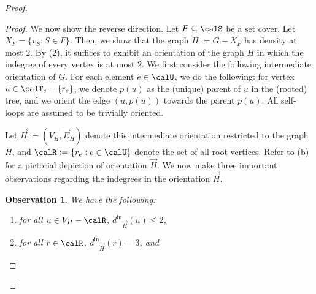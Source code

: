 \documentclass{article}
\newtheorem{observation}{Observation}[section]
\newcommand{\indegree}{\ensuremath{d^{\text{in}}}\xspace}
\begin{document}
\begin{proof}
\begin{proof}
        We now show the reverse direction. Let $F \subseteq \calS$ be a set cover. Let $X_F = \{v_S : S \in F\}$. Then, we show that the graph $H := G - X_F$ has density at most $2$. By (2), it suffices to exhibit an orientation of the graph $H$ in which the indegree of every vertex is at most $2$. We first consider the following intermediate orientation of $G$. For each element $e\in \calU$, we do the following: for vertex $u \in \calT_e - \{r_e\}$, we denote $p(u)$ as the (unique) parent of $u$ in the (rooted) tree, and we orient the edge $(u, p(u))$ towards the parent $p(u)$. All self-loops are assumed to be trivially oriented.
\iffalse
\begin{figure}
    \centering
\begin{minipage}{0.45\textwidth}
        \centering
        \texttt{[image: Full-version/technical-sections/diagrams/dds-diagram-hardness-2.pdf]} \caption{The  intermediate orientation for the subgraph of $H$ corresponding to an element $e \in \calU$. The greyed-out set-vertex at the bottom represents that this vertex is in $X_F$.}
        \label{fig:orientation:first}
    \end{minipage}
    \hfill
\begin{minipage}{0.45\textwidth}
        \centering
        \texttt{[image: Full-version/technical-sections/diagrams/dds-diagram-hardness-3.pdf]} \caption{The final orientation for the subgraph from \Cref{fig:orientation:first}. The highlighted edges are those that have been reoriented.}
        \label{fig:orientation:second}
    \end{minipage}
\end{figure}
\fi
Let $\vec{H} := (V_H, \vec{E}_H)$ denote this intermediate orientation restricted to the graph $H$, and $\calR := \{r_e: e\in \calU\}$ denote the set of all root vertices.
        Refer to (b)
for a pictorial depiction of   orientation $\vec{H}$.
        We now make three important observations regarding the indegrees in the orientation $\vec{H}$. 
        \begin{observation}\label{obs:apx-hardness-reduction-helper:orientation-properties}
        We have the following:
        \begin{enumerate}
            \item  for all $u \in V_H - \calR$, $\indegree_{\vec{H}}(u) \leq 2$,
            \item for all $r \in \calR$, $\indegree_{\vec{H}}(r) = 3$, and

\end{enumerate}
\end{observation}
\end{proof}
\end{proof}
\end{document}
